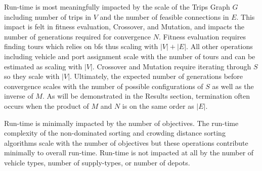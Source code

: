 Run-time is most meaningfully impacted by the scale of the Trips Graph $G$ including number of trips in $V$ and the number of feasible connections in $E$. This impact is felt in fitness evaluation, Crossover, and Mutation, and impacts the number of generations required for convergence $N$. Fitness evaluation requires finding tours which relies on \gls{bfs} thus scaling with $|V| + |E|$. All other operations including vehicle and port assignment scale with the number of tours and can be estimated as scaling with $|V|$. Crossover and Mutation require iterating through $S$ so they scale with $|V|$. Ultimately, the expected number of generations before convergence scales with the number of possible configurations of $S$ as well as the inverse of $M$. As will be demonstrated in the Results section, termination often occurs when the product of $M$ and $N$ is on the same order as $|E|$.

Run-time is minimally impacted by the number of objectives. The run-time complexity of the non-dominated sorting and crowding distance sorting algorithms scale with the number of objectives but these operations contribute minimally to overall run-time. Run-time is not impacted at all by the number of vehicle types, number of supply-types, or number of depots.